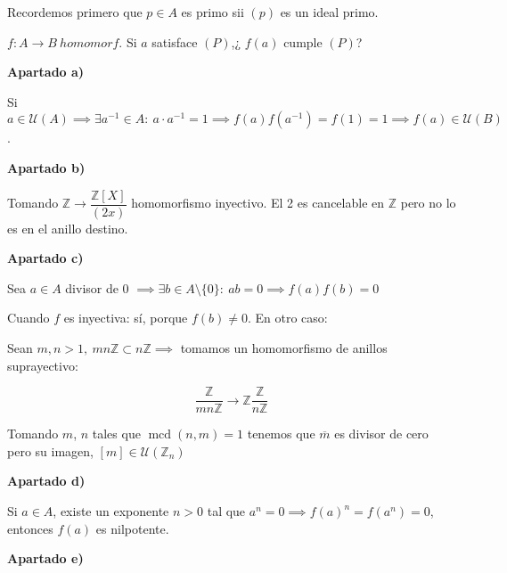 \documentclass[openany]{book}
\begin{document}
\begin{exercise}
    $  $
    
    Recordemos primero que $ p \in A $ es primo sii $ (p) $ es un ideal primo.

    $ f:A \to B\ homomorf $. Si $ a $ satisface $ (P) $,¿ $ f(a) $ cumple $ (P) $?
    
    \begin{flushright}
        \textbf{Apartado a)}
    \end{flushright}
    
    Si $ a \in \mathcal{U}(A) \implies \exists a ^{-1} \in A:\ a\cdot a ^{-1} = 1 \implies f(a)f(a ^{-1}) = f(1) = 1 \implies f(a) \in \mathcal{U}(B)$.

\begin{flushright}
    \textbf{Apartado b)}
\end{flushright}



Tomando $ \mathbb{Z} \to \dfrac{\mathbb{Z}[X]}{(2x)} $ homomorfismo inyectivo. El 2 es cancelable en $ \mathbb{Z} $ pero no lo es en el anillo destino.


\begin{flushright}
    \textbf{Apartado c)}
\end{flushright}

Sea $ a \in A $ divisor de 0 $ \implies \exists b \in A \setminus \{0\}:\ ab = 0 \implies f(a)f(b) = 0  $

Cuando $ f $ es inyectiva: sí, porque $ f(b)  \ne 0 $. En otro caso:

Sean $ m,n > 1,\ mn\mathbb{Z} \subset  n\mathbb{Z} \implies  $ tomamos un homomorfismo de anillos suprayectivo:

$$ \dfrac{\mathbb{Z}}{mn\mathbb{Z}} \to \mathbb{Z}\dfrac{\mathbb{Z}}{n\mathbb{Z}} $$

Tomando $ m $, $ n $ tales que $ \operatorname{mcd}(n,m) = 1 $ tenemos que $ \overline{m} $ es divisor de cero pero su imagen, $ [m] \in \mathcal{U}(\mathbb{Z}_{n}) $

\begin{flushright}
    \textbf{Apartado d)}
\end{flushright}

Si $ a \in A $, existe un exponente $ n > 0 $ tal que  $ a^{n} = 0 \implies f(a)^{n} = f(a^{n}) = 0 $, entonces $ f(a) $ es nilpotente.

\begin{flushright}
    \textbf{Apartado e)}
\end{flushright}


\end{exercise}
\end{document}
